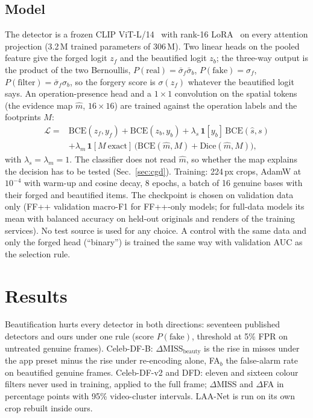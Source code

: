 \documentclass[conference]{IEEEtran}
\begin{document}
\subsection{Model}
\label{sec:model}
The detector is a frozen CLIP ViT-L/14~\cite{clip} with rank-16 LoRA~\cite{lora} on every attention projection (3.2\,M
trained parameters of 306\,M). Two linear heads on the pooled feature give the forged logit $z_f$ and the beautified logit
$z_b$; the three-way output is the product of the two Bernoullis, $P(\text{real})=\bar\sigma_f\bar\sigma_b$,
$P(\text{fake})=\sigma_f$, $P(\text{filter})=\bar\sigma_f\sigma_b$, so the forgery score is $\sigma(z_f)$ whatever the
beautified logit says. An operation-presence head and a $1\times1$ convolution on the spatial tokens (the evidence map
$\hat m$, $16\times16$) are trained against the operation labels and the footprints $M$:
\begin{align}
\mathcal{L}={}&\mathrm{BCE}(z_f,y_f)+\mathrm{BCE}(z_b,y_b)+\lambda_s\,\mathbf{1}[y_b]\,\mathrm{BCE}(\hat s,s) \nonumber\\
&+\lambda_m\,\mathbf{1}[M\ \text{exact}]\,\big(\mathrm{BCE}(\hat m,M)+\mathrm{Dice}(\hat m,M)\big),
\label{eq:loss}
\end{align}
with $\lambda_s=\lambda_m=1$. The classifier does not read $\hat m$, so whether the map explains the decision has to be
tested (Sec.~\ref{sec:cgd}). Training: 224\,px crops, AdamW at $10^{-4}$ with warm-up and cosine decay, 8 epochs, a batch
of 16 genuine bases with their forged and beautified items. The checkpoint is chosen on validation data only (FF++
validation macro-F1 for FF++-only models; for full-data models its mean with balanced accuracy on held-out originals and
renders of the training services). No test source is used for any choice. A control with the same data and only the
forged head (``binary'') is trained the same way with validation AUC as the selection rule.

\section{Results}
\label{sec:results}
\begin{table}[t]
\centering
\caption{Beautification hurts every detector in both directions: seventeen published detectors and ours under one rule
(score $P(\text{fake})$, threshold at 5\% FPR on untreated genuine frames). Celeb-DF-B: $\Delta$MISS$_\text{beauty}$ is
the rise in misses under the app preset minus the rise under re-encoding alone, FA$_b$ the false-alarm rate on
beautified genuine frames. Celeb-DF-v2 and DFD: eleven and sixteen colour filters never used in training, applied to
the full frame; $\Delta$MISS and $\Delta$FA in percentage points with 95\% video-cluster intervals. LAA-Net is run on
its own crop rebuilt inside ours.}
\label{tab:twosided}
\scriptsize
\begin{adjustbox}{max width=\textwidth}\end{adjustbox}
\end{table}
\end{document}
